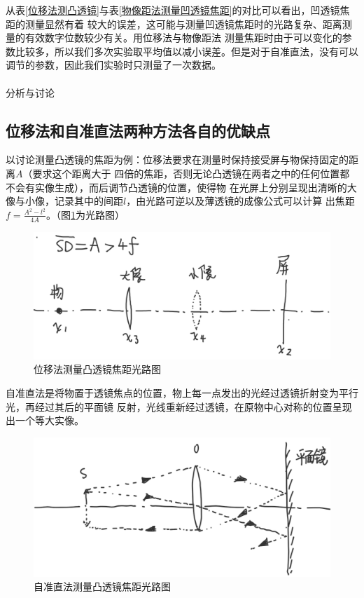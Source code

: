 \documentclass[a4paper]{ctexart}
\makeatletter
\renewcommand{\section}{\@startsection{section}{1}{0mm}
	{-\baselineskip}{0.5\baselineskip}{\bf\leftline}}
\makeatother
\begin{document}
		\par
		从表\ref{位移法测凸透镜}与表\ref{物像距法测量凹透镜焦距}的对比可以看出，凹透镜焦距的测量显然有着
		较大的误差，这可能与测量凹透镜焦距时的光路复杂、距离测量的有效数字位数较少有关。用位移法与物像距法
		测量焦距时由于可以变化的参数比较多，所以我们多次实验取平均值以减小误差。但是对于自准直法，没有可以
		调节的参数，因此我们实验时只测量了一次数据。\\
		\\
		
	\section{\large{分析与讨论}}
		\subsection{位移法和自准直法两种方法各自的优缺点}
			\par
			以讨论测量凸透镜的焦距为例：位移法要求在测量时保持接受屏与物保持固定的距离$A$（要求这个距离大于
			四倍的焦距，否则无论凸透镜在两者之中的任何位置都不会有实像生成），而后调节凸透镜的位置，使得物
			在光屏上分别呈现出清晰的大像与小像，记录其中的间距$l$，由光路可逆以及薄透镜的成像公式可以计算
			出焦距$f = \frac{A^2 - l^2}{4A}$。（图\ref{位移法光路图}为光路图）
			\begin{figure}[h]
				\centering
				\label{位移法光路图}
				\includegraphics[scale=0.3]{weiyifa.png}
				\caption{位移法测量凸透镜焦距光路图}
			\end{figure}
			\par
			自准直法是将物置于透镜焦点的位置，物上每一点发出的光经过透镜折射变为平行光，再经过其后的平面镜
			反射，光线重新经过透镜，在原物中心对称的位置呈现出一个等大实像。
			\begin{figure}[h]
				\centering
				\label{自准直法光路图}
				\includegraphics[scale=0.3]{zizhunzhifa.png}
				\caption{自准直法测量凸透镜焦距光路图}
			\end{figure}
\end{document}
